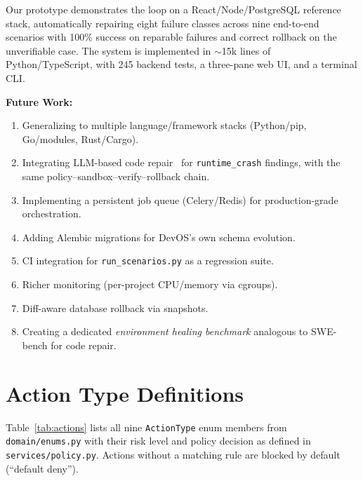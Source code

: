 \documentclass[conference,10pt,caption=false]{IEEEtran}
\begin{document}
Our prototype demonstrates the loop on a React/Node/PostgreSQL reference stack, automatically repairing eight failure classes across nine end-to-end scenarios with 100\% success on reparable failures and correct rollback on the unverifiable case. The system is implemented in $\sim$15k lines of Python/TypeScript, with 245 backend tests, a three-pane web UI, and a terminal CLI.

\textbf{Future Work:}
\begin{enumerate}[leftmargin=*, nosep]
    \item Generalizing to multiple language/framework stacks (Python/pip, Go/modules, Rust/Cargo).
    \item Integrating LLM-based code repair~\cite{llm-apr-survey-2025} for \texttt{runtime\_crash} findings, with the same policy--sandbox--verify--rollback chain.
    \item Implementing a persistent job queue (Celery/Redis) for production-grade orchestration.
    \item Adding Alembic migrations for DevOS's own schema evolution.
    \item CI integration for \texttt{run\_scenarios.py} as a regression suite.
    \item Richer monitoring (per-project CPU/memory via cgroups).
    \item Diff-aware database rollback via snapshots.
    \item Creating a dedicated \textit{environment healing benchmark} analogous to SWE-bench for code repair.
\end{enumerate}

\appendices

\section{Action Type Definitions}
\label{app:actions}
Table~\ref{tab:actions} lists all nine \texttt{ActionType} enum members from \texttt{domain/enums.py} with their risk level and policy decision as defined in \texttt{services/policy.py}. Actions without a matching rule are blocked by default (``default deny'').
\end{document}
